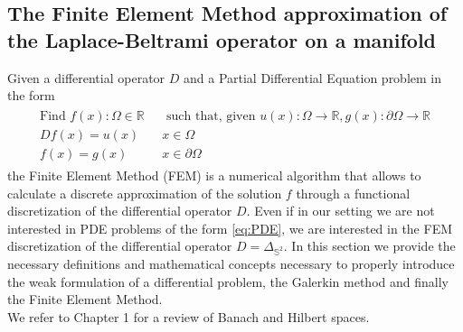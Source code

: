 \subsection{The Finite Element Method approximation of the Laplace-Beltrami operator on a manifold}\label{sec:Chapter3: Using the Finite Element Method to approximate the Laplace-Beltrami operator on a manifold}
Given a differential operator $D$ and a Partial Differential Equation problem in the form
\begin{align}\label{eq:PDE}
\begin{split}
\text{Find } f(x):\Omega\in\mathbb R &\text{ such that, given }u(x):\Omega\to\mathbb R, g(x):\partial\Omega\to\mathbb R\\
Df(x)=u(x)\quad&x\in\Omega\\
f(x)=g(x)\quad &x\in\partial\Omega
\end{split}
\end{align}
the Finite Element Method (FEM) is a numerical algorithm that allows to calculate a discrete approximation of the solution $f$ through a functional discretization of the differential operator $D$. Even if in our setting we are not interested in PDE problems of the form \ref{eq:PDE}, we are interested in the FEM discretization of the differential operator $D=\Delta_{\mathbb S^2}$. In this section we provide the necessary definitions and mathematical concepts necessary to properly introduce the weak formulation of a differential problem, the Galerkin method and finally the Finite Element Method.\\

We refer to Chapter 1 for a review of Banach and Hilbert spaces.
